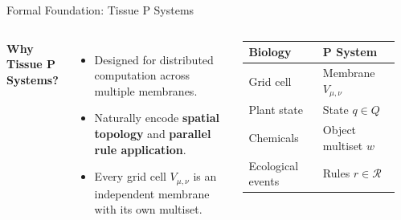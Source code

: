 \documentclass[aspectratio=169]{beamer}
\begin{document}
\begin{frame}{Formal Foundation: Tissue P Systems}
    \begin{columns}[T, onlytextwidth]
        \textbf{Why Tissue P Systems?}
        \begin{itemize}
            \item Designed for distributed computation across multiple membranes.
            \item Naturally encode \textbf{spatial topology} and \textbf{parallel rule application}.
            \item Every grid cell $V_{\mu,\nu}$ is an independent membrane with its own multiset.
        \end{itemize}
        \vspace{0.15cm}
        \centering
        {\small\begin{tabular}{@{}ll@{}}
            \toprule
            Biology & P System \\
            \midrule
            Grid cell & Membrane $V_{\mu,\nu}$ \\
            Plant state & State $q \in Q$ \\
            Chemicals & Object multiset $w$ \\
            Ecological events & Rules $r \in \mathcal{R}$ \\
            \bottomrule
        \end{tabular}}

        \vspace{-.5cm}
        \begin{center}
\end{center}
\end{columns}
\end{frame}
\end{document}
